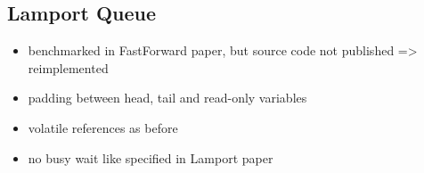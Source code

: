 \subsection{Lamport Queue}
\begin{itemize}
    \item benchmarked in FastForward paper, but source code not published => reimplemented
    \item padding between head, tail and read-only variables
    \item volatile references as before
    \item no busy wait like specified in Lamport paper
\end{itemize}
